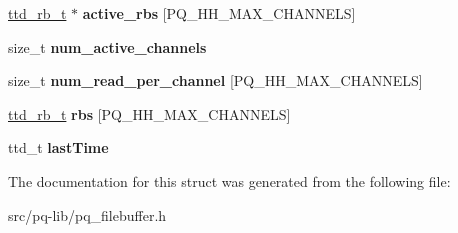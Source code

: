 \begin{DoxyCompactItemize}
\item 
\hypertarget{structpq__fb__t_a14862dbfee658e2372f2427613379410}{}\hyperlink{structttd__rb__t}{ttd\+\_\+rb\+\_\+t} $\ast$ {\bfseries active\+\_\+rbs} \mbox{[}P\+Q\+\_\+\+H\+H\+\_\+\+M\+A\+X\+\_\+\+C\+H\+A\+N\+N\+E\+L\+S\mbox{]}\label{structpq__fb__t_a14862dbfee658e2372f2427613379410}

\item 
\hypertarget{structpq__fb__t_af4d962092f59f859a5b31c06be8924c1}{}size\+\_\+t {\bfseries num\+\_\+active\+\_\+channels}\label{structpq__fb__t_af4d962092f59f859a5b31c06be8924c1}

\item 
\hypertarget{structpq__fb__t_af0d588bc598d68ba657125a2e191f048}{}size\+\_\+t {\bfseries num\+\_\+read\+\_\+per\+\_\+channel} \mbox{[}P\+Q\+\_\+\+H\+H\+\_\+\+M\+A\+X\+\_\+\+C\+H\+A\+N\+N\+E\+L\+S\mbox{]}\label{structpq__fb__t_af0d588bc598d68ba657125a2e191f048}

\item 
\hypertarget{structpq__fb__t_a2faa0f3de601ef77601480b836838e3a}{}\hyperlink{structttd__rb__t}{ttd\+\_\+rb\+\_\+t} {\bfseries rbs} \mbox{[}P\+Q\+\_\+\+H\+H\+\_\+\+M\+A\+X\+\_\+\+C\+H\+A\+N\+N\+E\+L\+S\mbox{]}\label{structpq__fb__t_a2faa0f3de601ef77601480b836838e3a}

\item 
\hypertarget{structpq__fb__t_a0120f52a9585c66f8f2eacbcfebe6ad9}{}ttd\+\_\+t {\bfseries last\+Time}\label{structpq__fb__t_a0120f52a9585c66f8f2eacbcfebe6ad9}

\end{DoxyCompactItemize}


The documentation for this struct was generated from the following file\+:\begin{DoxyCompactItemize}
\item 
src/pq-\/lib/pq\+\_\+filebuffer.\+h\end{DoxyCompactItemize}
